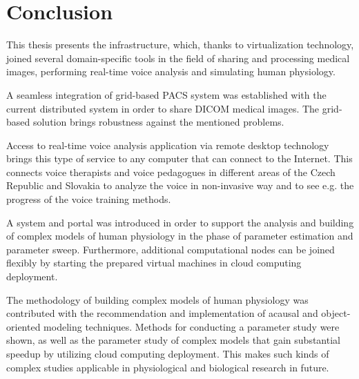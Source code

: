 \chapter{Conclusion}
\label{sec:conclusion}

This thesis presents the infrastructure, which, thanks to virtualization technology, joined several domain-specific tools in the field of sharing and processing medical images, performing real-time voice analysis and simulating human physiology.  

A seamless integration of grid-based PACS system was established with the current distributed system in order to share DICOM medical images. The grid-based solution brings robustness against the mentioned problems. 

Access to real-time voice analysis application via remote desktop technology brings this type of service to any computer that can connect to the Internet. This connects  voice therapists and voice pedagogues in different areas of the Czech Republic and Slovakia to analyze the voice in non-invasive  way and to see e.g. the progress of the voice training methods.

A system and portal was introduced in order to support the analysis and building of complex models of human physiology in the phase of parameter estimation and parameter sweep. Furthermore, additional computational nodes can be joined flexibly by starting the prepared virtual machines in cloud computing deployment. 

The methodology of building complex models of human physiology was contributed with the recommendation and implementation of acausal and object-oriented modeling techniques. Methods for conducting a parameter study were shown, as well as the parameter study of complex models that gain substantial speedup by utilizing cloud computing deployment. This makes such kinds of complex studies applicable in physiological and biological research in future.

